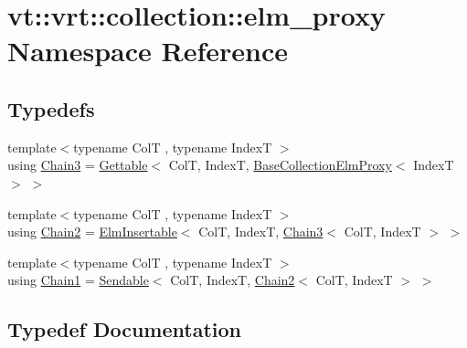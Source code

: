 \hypertarget{namespacevt_1_1vrt_1_1collection_1_1elm__proxy}{}\section{vt\+:\+:vrt\+:\+:collection\+:\+:elm\+\_\+proxy Namespace Reference}
\label{namespacevt_1_1vrt_1_1collection_1_1elm__proxy}
\subsection*{Typedefs}
\begin{DoxyCompactItemize}
\item 
{\footnotesize template$<$typename ColT , typename IndexT $>$ }\\using \hyperlink{namespacevt_1_1vrt_1_1collection_1_1elm__proxy_a3a1b8a69ce5220709c14028b899f128f}{Chain3} = \hyperlink{structvt_1_1vrt_1_1collection_1_1_gettable}{Gettable}$<$ ColT, IndexT, \hyperlink{structvt_1_1vrt_1_1collection_1_1_base_collection_elm_proxy}{Base\+Collection\+Elm\+Proxy}$<$ IndexT $>$ $>$
\item 
{\footnotesize template$<$typename ColT , typename IndexT $>$ }\\using \hyperlink{namespacevt_1_1vrt_1_1collection_1_1elm__proxy_ad78450181b0704fe0969ae1d0f6cb4c7}{Chain2} = \hyperlink{structvt_1_1vrt_1_1collection_1_1_elm_insertable}{Elm\+Insertable}$<$ ColT, IndexT, \hyperlink{namespacevt_1_1vrt_1_1collection_1_1elm__proxy_a3a1b8a69ce5220709c14028b899f128f}{Chain3}$<$ ColT, IndexT $>$ $>$
\item 
{\footnotesize template$<$typename ColT , typename IndexT $>$ }\\using \hyperlink{namespacevt_1_1vrt_1_1collection_1_1elm__proxy_af1c695e3f939aca249111179a57b24bf}{Chain1} = \hyperlink{structvt_1_1vrt_1_1collection_1_1_sendable}{Sendable}$<$ ColT, IndexT, \hyperlink{namespacevt_1_1vrt_1_1collection_1_1elm__proxy_ad78450181b0704fe0969ae1d0f6cb4c7}{Chain2}$<$ ColT, IndexT $>$ $>$
\end{DoxyCompactItemize}


\subsection{Typedef Documentation}
\mbox{\label{namespacevt_1_1vrt_1_1collection_1_1elm__proxy_af1c695e3f939aca249111179a57b24bf}} 
